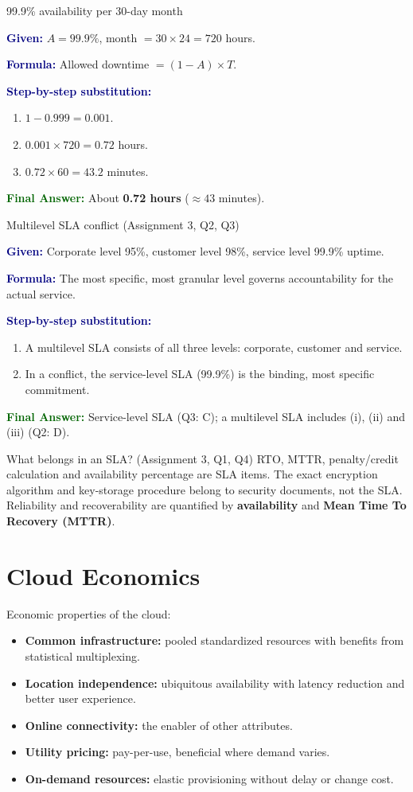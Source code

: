 \documentclass[11pt,a4paper,openany]{report}
\newcommand{\Given}{\par\textbf{\textcolor{navy}{Given:}} }
\newcommand{\Formula}{\par\textbf{\textcolor{navy}{Formula:}} }
\newcommand{\Steps}{\par\textbf{\textcolor{navy}{Step-by-step substitution:}}\par}
\newcommand{\Answer}{\par\textbf{\textcolor{darkgreen}{Final Answer:}} }
\begin{document}
\begin{solved}{99.9\% availability per 30-day month}
\Given $A = 99.9\%$, month $= 30 \times 24 = 720$ hours.
\Formula Allowed downtime $= (1 - A) \times T$.
\Steps
\begin{enumerate}[leftmargin=*]
  \item $1 - 0.999 = 0.001$.
  \item $0.001 \times 720 = 0.72$ hours.
  \item $0.72 \times 60 = 43.2$ minutes.
\end{enumerate}
\Answer About \textbf{0.72 hours} ($\approx 43$ minutes).
\end{solved}

\begin{solved}{Multilevel SLA conflict (Assignment 3, Q2, Q3)}
\Given Corporate level 95\%, customer level 98\%, service level 99.9\% uptime.
\Formula The most specific, most granular level governs accountability for the actual service.
\Steps
\begin{enumerate}[leftmargin=*]
  \item A multilevel SLA consists of all three levels: corporate, customer and service.
  \item In a conflict, the service-level SLA (99.9\%) is the binding, most specific commitment.
\end{enumerate}
\Answer Service-level SLA (Q3: C); a multilevel SLA includes (i), (ii) and (iii) (Q2: D).
\end{solved}

\begin{notebox}{What belongs in an SLA? (Assignment 3, Q1, Q4)}
RTO, MTTR, penalty/credit calculation and availability percentage are SLA items. The exact encryption algorithm and
key-storage procedure belong to security documents, not the SLA. Reliability and recoverability are quantified by
\textbf{availability} and \textbf{Mean Time To Recovery (MTTR)}.
\end{notebox}

\section{Cloud Economics}
Economic properties of the cloud:
\begin{itemize}[leftmargin=*]
  \item \textbf{Common infrastructure:} pooled standardized resources with benefits from statistical multiplexing.
  \item \textbf{Location independence:} ubiquitous availability with latency reduction and better user experience.
  \item \textbf{Online connectivity:} the enabler of other attributes.
  \item \textbf{Utility pricing:} pay-per-use, beneficial where demand varies.
  \item \textbf{On-demand resources:} elastic provisioning without delay or change cost.
\end{itemize}
\end{document}
